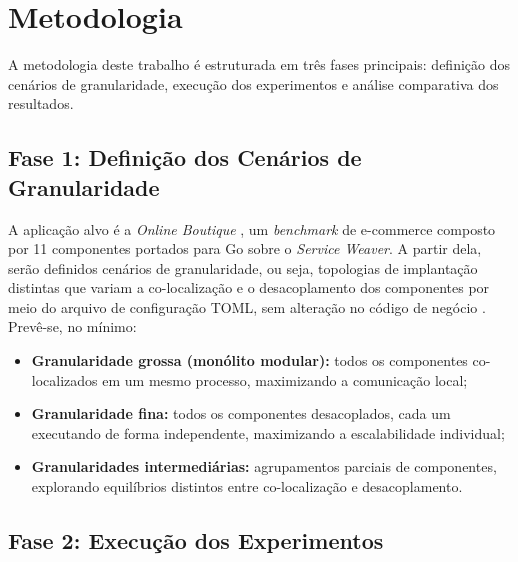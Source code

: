 
\chapter{Metodologia}
\label{cap:metodologia}

A metodologia deste trabalho é estruturada em três fases principais: definição dos cenários de granularidade, execução dos experimentos e análise comparativa dos resultados.

\section{Fase 1: Definição dos Cenários de Granularidade}
\label{sec:fase1}

A aplicação alvo é a \textit{Online Boutique} \cite{mendonca2024serviceweaver, ghemawat2023serviceweaver}, um \textit{benchmark} de e-commerce composto por 11 componentes portados para Go sobre o \textit{Service Weaver}. A partir dela, serão definidos cenários de granularidade, ou seja, topologias de implantação distintas que variam a co-localização e o desacoplamento dos componentes por meio do arquivo de configuração TOML, sem alteração no código de negócio \cite{mendonca2024serviceweaver, rego2025granularity}. Prevê-se, no mínimo:
\begin{itemize}
    \item \textbf{Granularidade grossa (monólito modular):} todos os componentes co-localizados em um mesmo processo, maximizando a comunicação local;
    \item \textbf{Granularidade fina:} todos os componentes desacoplados, cada um executando de forma independente, maximizando a escalabilidade individual;
    \item \textbf{Granularidades intermediárias:} agrupamentos parciais de componentes, explorando equilíbrios distintos entre co-localização e desacoplamento.
\end{itemize}

\section{Fase 2: Execução dos Experimentos}
\label{sec:fase2}

